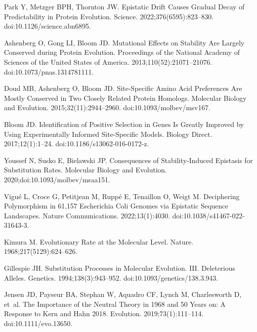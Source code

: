 \documentclass[10pt,letterpaper]{article}
\begin{document}
\begin{thebibliography}{10}
Park Y, Metzger BPH, Thornton JW.
\newblock Epistatic Drift Causes Gradual Decay of Predictability in Protein
Evolution.
\newblock Science. 2022;376(6595):823--830.
\newblock doi:{10.1126/science.abn6895}.

Ashenberg O, Gong LI, Bloom JD.
\newblock Mutational Effects on Stability Are Largely Conserved during Protein
Evolution.
\newblock Proceedings of the National Academy of Sciences of the United States
of America. 2013;110(52):21071--21076.
\newblock doi:{10.1073/pnas.1314781111}.

Doud MB, Ashenberg O, Bloom JD.
\newblock Site-{{Specific Amino Acid Preferences Are Mostly Conserved}} in
{{Two Closely Related Protein Homologs}}.
\newblock Molecular Biology and Evolution. 2015;32(11):2944--2960.
\newblock doi:{10.1093/molbev/msv167}.

Bloom JD.
\newblock Identification of Positive Selection in Genes Is Greatly Improved by
Using Experimentally Informed Site-Specific Models.
\newblock Biology Direct. 2017;12(1):1--24.
\newblock doi:{10.1186/s13062-016-0172-z}.

Youssef N, Susko E, Bielawski JP.
\newblock Consequences of Stability-Induced Epistasis for Substitution Rates.
\newblock Molecular Biology and Evolution. 2020;doi:{10.1093/molbev/msaa151}.

Vigu{\'e} L, Croce G, Petitjean M, Rupp{\'e} E, Tenaillon O, Weigt M.
\newblock Deciphering Polymorphism in 61,157 {{Escherichia}} Coli Genomes via
Epistatic Sequence Landscapes.
\newblock Nature Communications. 2022;13(1):4030.
\newblock doi:{10.1038/s41467-022-31643-3}.

Kimura M.
\newblock Evolutionary Rate at the Molecular Level.
\newblock Nature. 1968;217(5129):624--626.

Gillespie JH.
\newblock Substitution Processes in Molecular Evolution. {{III}}.
{{Deleterious}} Alleles.
\newblock Genetics. 1994;138(3):943--952.
\newblock doi:{10.1093/genetics/138.3.943}.

Jensen JD, Payseur BA, Stephan W, Aquadro CF, Lynch M, Charlesworth D, et~al.
\newblock The Importance of the {{Neutral Theory}} in 1968 and 50 Years on:
{{A}} Response to {{Kern}} and {{Hahn}} 2018.
\newblock Evolution. 2019;73(1):111--114.
\newblock doi:{10.1111/evo.13650}.


\end{thebibliography}
\end{document}
